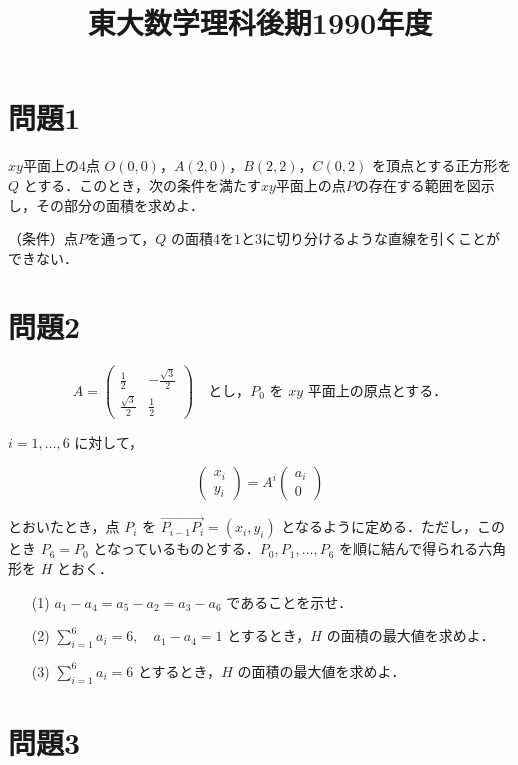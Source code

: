 \documentclass[unicode,12pt, A4j]{ltjsarticle}%
\title{東大数学理科後期1990年度}
\author{}
\date{}
\begin{document}
\maketitle

\section{問題1}
$xy$平面上の$4$点 $O(0,0)$，$A(2,0)$，$B(2,2)$，$C(0,2)$ を頂点とする正方形を $Q$ とする．このとき，次の条件を満たす$xy$平面上の点$P$の存在する範囲を図示し，その部分の面積を求めよ．

（条件）点$P$を通って，$Q$ の面積$4$を$1$と$3$に切り分けるような直線を引くことができない．


\section{問題2}
\[
A = 
\begin{pmatrix}
\frac{1}{2} & -\frac{\sqrt{3}}{2} \\
\frac{\sqrt{3}}{2} & \frac{1}{2}
\end{pmatrix}
\quad \text{とし，} P_0 \text{ を } xy \text{ 平面上の原点とする．}
\]

$i = 1, \dots, 6$ に対して，

\[
\begin{pmatrix}
x_i \\
y_i
\end{pmatrix}
= A^i
\begin{pmatrix}
a_i \\
0
\end{pmatrix}
\]

とおいたとき，点 $P_i$ を $\overrightarrow{P_{i-1}P_i} = (x_i, y_i)$ となるように定める．ただし，このとき $P_6 = P_0$ となっているものとする．$P_0, P_1, \dots, P_6$ を順に結んで得られる六角形を $H$ とおく．

\begin{enumerate}
\item[(1)] $a_1 - a_4 = a_5 - a_2 = a_3 - a_6$ であることを示せ．
\item[(2)] $\sum_{i=1}^6 a_i = 6,\quad a_1 - a_4 = 1$ とするとき，$H$ の面積の最大値を求めよ．
\item[(3)] $\sum_{i=1}^6 a_i = 6$ とするとき，$H$ の面積の最大値を求めよ．
\end{enumerate}


\section{問題3}
\end{document}

